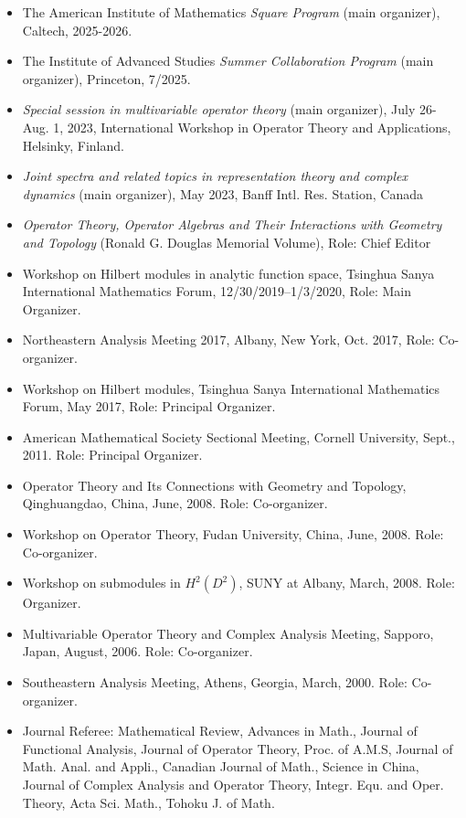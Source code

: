 \documentclass[12pt]{res} %
\begin{document}
\begin{resume}
\begin{itemize}
 \item The American Institute of Mathematics {\em Square Program} (main organizer), Caltech, 2025-2026.
\item The Institute of Advanced Studies {\em Summer Collaboration Program} (main organizer), Princeton, 7/2025.
\item {\em Special session in multivariable operator theory} (main organizer), July 26-Aug. 1, 2023, International Workshop in Operator Theory and Applications, Helsinky, Finland.
\item {\em Joint spectra and related topics in representation theory and complex dynamics} (main organizer), May 2023, Banff Intl. Res. Station, Canada
\item {\em Operator Theory, Operator Algebras and Their Interactions with Geometry and Topology} (Ronald G. Douglas Memorial Volume), Role: Chief Editor
\item {Workshop on Hilbert modules in analytic function space}, Tsinghua Sanya International Mathematics Forum, 12/30/2019--1/3/2020, Role: Main Organizer.
\item {Northeastern Analysis Meeting 2017}, Albany, New York, Oct. 2017, Role: Co-organizer.
  \item {Workshop on Hilbert modules}, Tsinghua Sanya International Mathematics Forum, May 2017, Role: Principal Organizer.
   \item {American Mathematical Society Sectional Meeting}, Cornell University, Sept., 2011. Role: Principal Organizer.
   \item {Operator Theory and Its Connections with Geometry and Topology}, Qinghuangdao, China, June, 2008. Role: Co-organizer.
   \item {Workshop on Operator Theory}, Fudan University, China, June, 2008. Role: Co-organizer.
   \item {Workshop on submodules in $H^2(D^2)$}, SUNY at Albany, March, 2008. Role: Organizer.
   \item {Multivariable Operator Theory and Complex Analysis Meeting}, Sapporo, Japan, August, 2006. Role: Co-organizer.
   \item {Southeastern Analysis Meeting}, Athens, Georgia, March, 2000. Role: Co-organizer.
   \item {Journal Referee}: Mathematical Review, Advances in Math., Journal of Functional Analysis, Journal of Operator Theory, Proc. of A.M.S, Journal of Math. Anal. and Appli., Canadian Journal of Math., Science in China, Journal of Complex Analysis and Operator Theory, Integr. Equ. and Oper. Theory, Acta Sci. Math., Tohoku J. of Math.


\end{itemize}
\end{resume}
\end{document}
